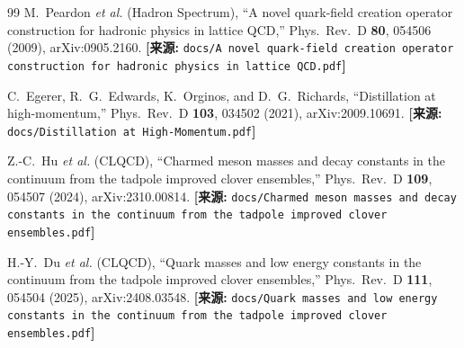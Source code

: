 \documentclass[12pt,a4paper]{ctexart}
\theoremstyle{definition}
\begin{document}
\begin{thebibliography}{99}
M.~Peardon \textit{et al.} (Hadron Spectrum),
``A novel quark-field creation operator construction for hadronic physics in lattice QCD,''
Phys.\ Rev.\ D \textbf{80}, 054506 (2009), arXiv:0905.2160.
\quad\textbf{[来源:} \texttt{docs/A novel quark-field creation operator construction for hadronic physics in lattice QCD.pdf}\textbf{]}

C.~Egerer, R.~G.~Edwards, K.~Orginos, and D.~G.~Richards,
``Distillation at high-momentum,''
Phys.\ Rev.\ D \textbf{103}, 034502 (2021), arXiv:2009.10691.
\quad\textbf{[来源:} \texttt{docs/Distillation at High-Momentum.pdf}\textbf{]}

Z.-C.~Hu \textit{et al.} (CLQCD),
``Charmed meson masses and decay constants in the continuum from the tadpole improved clover ensembles,''
Phys.\ Rev.\ D \textbf{109}, 054507 (2024), arXiv:2310.00814.
\quad\textbf{[来源:} \texttt{docs/Charmed meson masses and decay constants in the continuum from the tadpole improved clover ensembles.pdf}\textbf{]}

H.-Y.~Du \textit{et al.} (CLQCD),
``Quark masses and low energy constants in the continuum from the tadpole improved clover ensembles,''
Phys.\ Rev.\ D \textbf{111}, 054504 (2025), arXiv:2408.03548.
\quad\textbf{[来源:} \texttt{docs/Quark masses and low energy constants in the continuum from the tadpole improved clover ensembles.pdf}\textbf{]}

\end{thebibliography}
\end{document}
